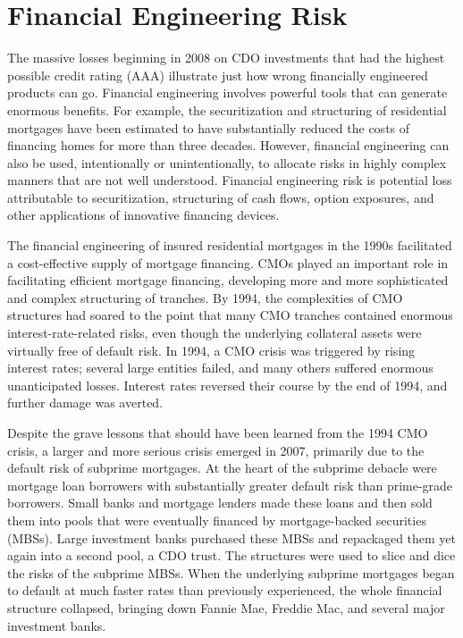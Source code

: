 \documentclass[11pt]{article}
\begin{document}
\section*{Financial Engineering Risk}
The massive losses beginning in 2008 on CDO investments that had the highest possible credit rating (AAA) illustrate just how wrong financially engineered products can go. Financial engineering involves powerful tools that can generate enormous benefits. For example, the securitization and structuring of residential mortgages have been estimated to have substantially reduced the costs of financing homes for more than three decades. However, financial engineering can also be used, intentionally or unintentionally, to allocate risks in highly complex manners that are not well understood. Financial engineering risk is potential loss attributable to securitization, structuring of cash flows, option exposures, and other applications of innovative financing devices.

The financial engineering of insured residential mortgages in the 1990s facilitated a cost-effective supply of mortgage financing. CMOs played an important role in facilitating efficient mortgage financing, developing more and more sophisticated and complex structuring of tranches. By 1994, the complexities of CMO structures had soared to the point that many CMO tranches contained enormous interest-rate-related risks, even though the underlying collateral assets were virtually free of default risk. In 1994, a CMO crisis was triggered by rising interest rates; several large entities failed, and many others suffered enormous unanticipated losses. Interest rates reversed their course by the end of 1994, and further damage was averted.

Despite the grave lessons that should have been learned from the 1994 CMO crisis, a larger and more serious crisis emerged in 2007, primarily due to the default risk of subprime mortgages. At the heart of the subprime debacle were mortgage loan borrowers with substantially greater default risk than prime-grade borrowers. Small banks and mortgage lenders made these loans and then sold them into pools that were eventually financed by mortgage-backed securities (MBSs). Large investment banks purchased these MBSs and repackaged them yet again into a second pool, a CDO trust. The structures were used to slice and dice the risks of the subprime MBSs. When the underlying subprime mortgages began to default at much faster rates than previously experienced, the whole financial structure collapsed, bringing down Fannie Mae, Freddie Mac, and several major investment banks.
\end{document}
